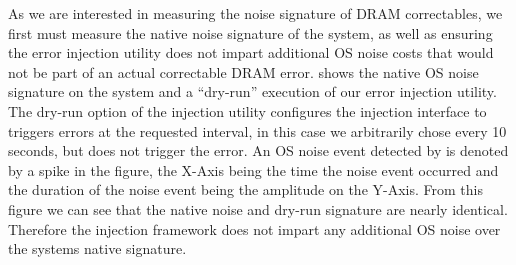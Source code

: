 As we are interested in measuring the noise signature of DRAM correctables, we
first must measure the native noise signature of the system, as well as ensuring
the error injection utility does not impart additional OS noise costs that would
not be part of an actual correctable DRAM error.   shows the
native OS noise signature on the \blake system and a ``dry-run'' execution of
our error injection utility.  The dry-run option of the injection utility
configures the injection interface to triggers errors at the requested interval,
in this case we arbitrarily chose every 10 seconds, but does not trigger the
error.  An OS noise event detected by \selfish is denoted by a spike in the
figure, the X-Axis being the time the noise event occurred and the duration of
the noise event being the amplitude on the Y-Axis.  From this figure we can see
that the native noise and dry-run signature are nearly identical.  Therefore the
injection framework does not impart any additional OS noise over the systems
native signature.  

\begin{figure*}
\caption{
}
\label{fig:DRAM_cost}
\end{figure*}
